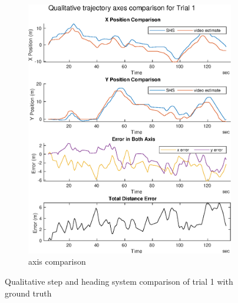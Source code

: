 \begin{figure}[H]
\begin{subfigure}[t]{.45\textwidth}
		\includegraphics[width=\linewidth]{images/20201202_0913_Qualitative_trajectory_axes_comparison_for_Trial_1_1}
		\caption{axis comparison}
		\label{fig:trial1_comparison}
	\end{subfigure}
\setlength{\belowcaptionskip}{-10pt}
	\caption{Qualitative step and heading system comparison of trial 1 with ground truth}
	\label{fig:trial1_shs_gt_comparison}
\end{figure}

